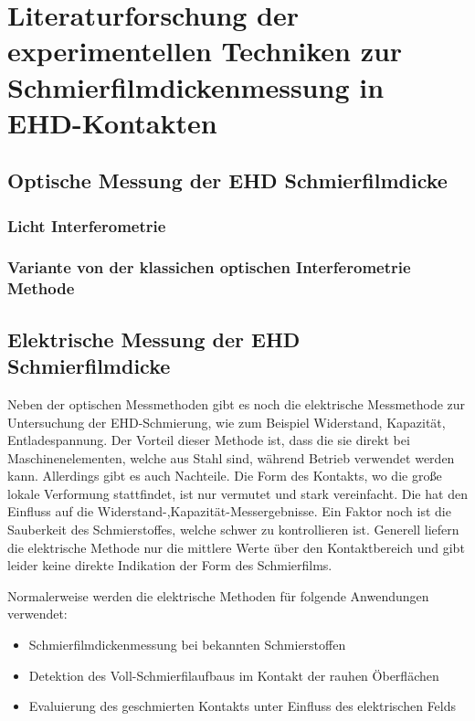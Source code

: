 \chapter{Literaturforschung der experimentellen Techniken zur Schmierfilmdickenmessung in EHD-Kontakten}
\label{chap:literaturforschung_der_experimentellen_technik_in_ehd_schmierung}
\section{Optische Messung der EHD Schmierfilmdicke}
\label{sec:optische_messung_der_ehd_schmierfilmdicke}

\subsection{Licht Interferometrie}
\label{ssec:licht_interferometrie}

\subsection{Variante von der klassichen optischen Interferometrie Methode}
\label{ssec:variante_interferometrie}

\section{Elektrische Messung der EHD Schmierfilmdicke}
\label{sec:elektrische_messung_der_ehd_schmierfilmdicke}

Neben der optischen Messmethoden gibt es noch die elektrische Messmethode zur Untersuchung der EHD-Schmierung, wie zum Beispiel Widerstand, Kapazität, Entladespannung.
Der Vorteil dieser Methode ist, dass die sie direkt bei Maschinenelementen, welche aus Stahl sind, während Betrieb verwendet werden kann.
Allerdings gibt es auch Nachteile.
Die Form des Kontakts, wo die große lokale Verformung stattfindet, ist nur vermutet und stark vereinfacht.
Die hat den Einfluss auf die Widerstand-,Kapazität-Messergebnisse.
Ein Faktor noch ist die Sauberkeit des Schmierstoffes, welche schwer zu kontrollieren ist.
Generell liefern die elektrische Methode nur die mittlere Werte über den Kontaktbereich und gibt leider keine direkte Indikation der Form des Schmierfilms.

Normalerweise werden die elektrische Methoden für folgende Anwendungen verwendet:
\begin{itemize}
    \item Schmierfilmdickenmessung bei bekannten Schmierstoffen
    \item Detektion des Voll-Schmierfilaufbaus im Kontakt der rauhen Öberflächen
    \item Evaluierung des geschmierten Kontakts unter Einfluss des elektrischen Felds
\end{itemize}

